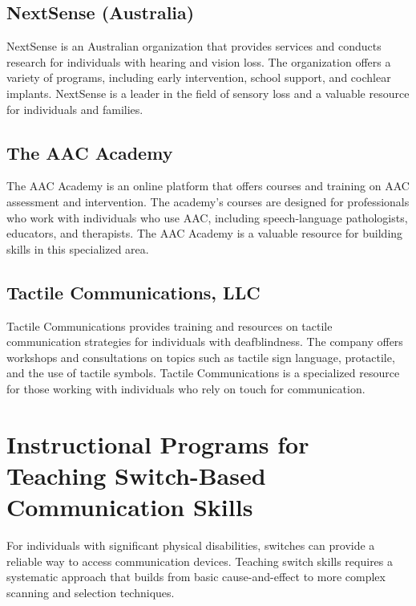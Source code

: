 \subsection{NextSense (Australia)}\label{app6:nextsense}
NextSense is an Australian organization that provides services and conducts research for individuals with hearing and vision loss. The organization offers a variety of programs, including early intervention, school support, and cochlear implants. NextSense is a leader in the field of sensory loss and a valuable resource for individuals and families.

\subsection{The AAC Academy}\label{app6:aac-academy}
The AAC Academy is an online platform that offers courses and training on AAC assessment and intervention. The academy's courses are designed for professionals who work with individuals who use AAC, including speech-language pathologists, educators, and therapists. The AAC Academy is a valuable resource for building skills in this specialized area.

\subsection{Tactile Communications, LLC}\label{app6:tactile-comm}
Tactile Communications provides training and resources on tactile communication strategies for individuals with deafblindness. The company offers workshops and consultations on topics such as tactile sign language, protactile, and the use of tactile symbols. Tactile Communications is a specialized resource for those working with individuals who rely on touch for communication.

\section{Instructional Programs for Teaching Switch-Based Communication Skills}\label{app6:switch-comm}
For individuals with significant physical disabilities, switches can provide a reliable way to access communication devices. Teaching switch skills requires a systematic approach that builds from basic cause-and-effect to more complex scanning and selection techniques.

